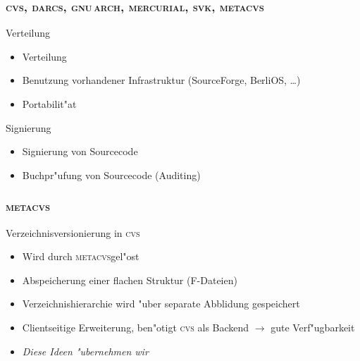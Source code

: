 \documentclass[german]{beamer}
\newcommand{\METACVS}{\textsc{metacvs}}
\newcommand{\CVS}{\textsc{cvs}}
\newcommand{\DARCS}{\textsc{darcs}}
\newcommand{\GNUARCH}{\textsc{gnu\,arch}}
\newcommand{\MERCURIAL}{\textsc{mercurial}}
\newcommand{\SVK}{\textsc{svk}}
\begin{document}
\begin{frame}
  \frametitle{\CVS, \DARCS, \GNUARCH, \MERCURIAL, \SVK, \METACVS}
  \begin{block}{Verteilung}
    \begin{itemize}
    \item Verteilung
    \item Benutzung vorhandener Infrastruktur (SourceForge, BerliOS,
      \ldots)
    \item Portabilit"at
    \end{itemize}
  \end{block}
  \begin{block}{Signierung}
    \begin{itemize}
    \item Signierung von Sourcecode
    \item Buchpr"ufung von Sourcecode (Auditing)
    \end{itemize}
  \end{block}
  
\end{frame}

\begin{frame}
  \frametitle{\METACVS}
  \begin{block}{Verzeichnisversionierung in \CVS}
    \begin{itemize}
    \item Wird durch \METACVS gel"ost
    \item Abspeicherung einer flachen Struktur (F-Dateien)
    \item Verzeichnishierarchie wird "uber separate Abblidung
      gespeichert
    \item Clientseitige Erweiterung, ben"otigt \CVS{} als Backend
      $\rightarrow$ gute Verf"ugbarkeit
    \item \emph{Diese Ideen "ubernehmen wir}
    \end{itemize}
  \end{block}
\end{frame}
\end{document}
